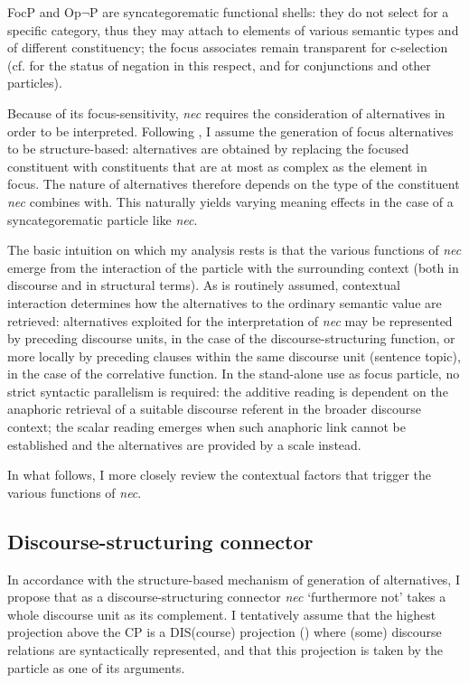\documentclass[output=paper,modfonts,nonflat,citecolor=brown,
showindex
]{langsci/langscibook}
\begin{document}
FocP and Op$\lnot$P are syncategorematic functional shells: they do not select for a specific category, thus they may attach to elements of various semantic types and of different constituency; the focus associates remain transparent for c-selection (cf. \citealt[120-126]{Cinque99} for the status of negation in this respect, and \citealt[199-203]{BHR14} for conjunctions and other particles).

Because of its focus-sensitivity, {\em{nec}} requires the consideration of alternatives in order to be interpreted. Following \citet{Katzir07, FoxKatzir11}, I assume the generation of focus alternatives to be structure-based: alternatives are obtained by replacing the focused constituent with constituents that are at most as complex as the element in focus. The nature of alternatives therefore depends on the type of the constituent {\em{nec}} combines with. This naturally yields varying meaning effects in the case of a syncategorematic particle like {\em{nec}}.

The basic intuition on which my analysis rests is that the various functions of {\em{nec}} emerge from the interaction of the particle with the surrounding context (both in discourse and in structural terms). As is routinely assumed, contextual interaction determines how the alternatives to the ordinary semantic value are retrieved: alternatives exploited for the interpretation of {\em{nec}} may be represented by preceding discourse units, in the case of the discourse-structuring function, or more locally by preceding clauses within the same discourse unit (sentence topic), in the case of the correlative function. In the stand-alone use as focus particle, no strict syntactic parallelism is required: the additive reading is dependent on the anaphoric retrieval of a suitable discourse referent in the broader discourse context; the scalar reading emerges when such anaphoric link cannot be established and the alternatives are provided by a scale instead. 

In what follows, I more closely review the contextual factors that trigger the various functions of {\em{nec}}.

\subsection{Discourse-structuring connector} \label{analysisdiscuousestructuring}

In accordance with the structure-based mechanism of generation of alternatives, I propose that as a discourse-structuring connector {\em{nec}} `furthermore not' takes a whole discourse unit as its complement. I tentatively assume that the highest projection above the CP is a DIS(course) projection (\citealt{Giorgi15}) where (some) discourse relations are syntactically represented, and that this projection is taken by the particle as one of its arguments.
\end{document}
